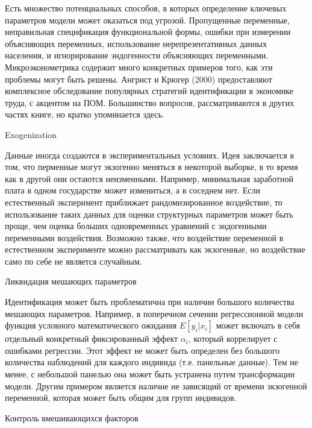 Есть множество потенциальных способов, в которых определение ключевых параметров модели может оказаться под угрозой. Пропущенные переменные, неправильная спецификация функциональной формы, ошибки при измерении объясняющих переменных, использование нерепрезентативных данных населения, и игнорирование эндогенности объясняющих переменными. Микроэконометрика содержит много конкретных примеров того, как эти проблемы могут быть решены. Ангрист и Крюгер (2000) предоставляют комплексное обследование популярных стратегий идентификации в экономике труда, с акцентом на ПОМ. Большинство вопросов, рассматриваются в других частях книге, но кратко упоминается здесь.


\begin{center}
Exogenization
\end{center}


Данные иногда создаются в экспериментальных условиях. Идея заключается в том, что перменные могут экзогенно меняться  в некоторой выборке, в то время как в другой они остаются неизменными. Например,  минимальная заработной плата в одном государстве может измениться, а в соседнем нет. Если естественный эксперимент приближает рандомизированное воздействие, то использование таких данных для оценки структурных параметров может быть проще, чем оценка больших одновременных уравнений с эндогенными переменными воздействия. Возможно также, что воздействие переменной в естественном эксперименте можно рассматривать как экзогенные, но воздействие само по себе не является случайным.


\begin{center}
Ликвидация мешающих параметров
\end{center}


Идентификация может быть проблематична при наличии большого количества мешающих параметров. Например, в поперечном сечении регрессионной модели функция условного математического ожидания $E[y_{i}|x_{i}]$ может включать в себя отдельный конкретный фиксированный эффект $\alpha_{i}$, который коррелирует с ошибками регрессии. Этот эффект не может быть определен без большого количества наблюдений для каждого индивида (т.е. панельные данные). Тем не менее, с небольшой панелью она может быть устранена путем трансформации модели. Другим примером является наличие не зависящий от времени экзогенной переменной, которая может быть общим для групп индивидов.


\begin{center}
Контроль вмешивающихся факторов
\end{center}



